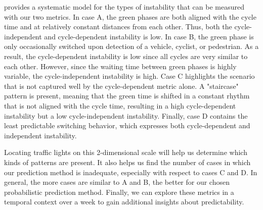  provides a systematic model for the types of instability that can be measured with our two metrics. In case A, the green phases are both aligned with the cycle time and at relatively constant distances from each other. Thus, both the cycle-independent and cycle-dependent instability is low. In case B, the green phase is only occasionally switched upon detection of a vehicle, cyclist, or pedestrian. As a result, the cycle-dependent instability is low since all cycles are very similar to each other. However, since the waiting time between green phases is highly variable, the cycle-independent instability is high. Case C highlights the scenario that is not captured well by the cycle-dependent metric alone. A "staircase" pattern is present, meaning that the green time is shifted in a constant rhythm that is not aligned with the cycle time, resulting in a high cycle-dependent instability but a low cycle-independent instability. Finally, case D contains the least predictable switching behavior, which expresses both cycle-dependent and independent instability. 

Locating traffic lights on this 2-dimensional scale will help us determine which kinds of patterns are present. It also helps us find the number of cases in which our prediction method is inadequate, especially with respect to cases C and D. In general, the more cases are similar to A and B, the better for our chosen probabilistic prediction method. Finally, we can explore these metrics in a temporal context over a week to gain additional insights about predictability.

